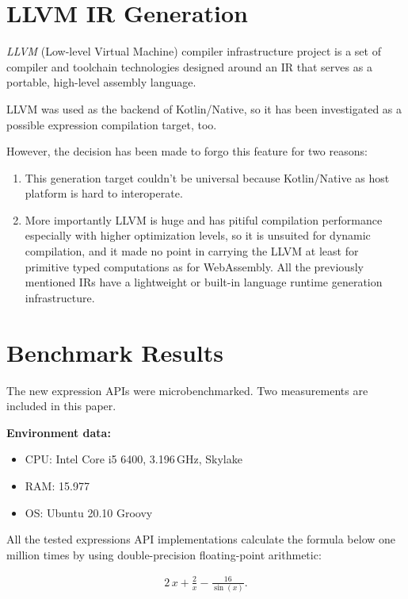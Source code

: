 \documentclass[conference]{IEEEtran}
\begin{document}
\section{LLVM IR Generation}
\textit{LLVM} (Low-level Virtual Machine) \cite{1281665} compiler infrastructure project is a set of compiler and toolchain technologies designed around an IR that serves as a portable, high-level assembly language.

LLVM was used as the backend of Kotlin/Native, so it has been investigated as a possible expression compilation target, too.

However, the decision has been made to forgo this feature for two reasons:

\begin{enumerate}
    \item This generation target couldn't be universal because Kotlin/Native as host platform is hard to interoperate.
    \item More importantly LLVM is huge and has pitiful compilation performance especially with higher optimization levels, so it is unsuited for dynamic compilation, and it made no point in carrying the LLVM at least for primitive typed computations as for WebAssembly. All the previously mentioned IRs have a lightweight or built-in language runtime generation infrastructure.
\end{enumerate}

\section{Benchmark Results}

The new expression APIs were microbenchmarked. Two measurements are included in this paper.

\textbf{Environment data:}

\begin{itemize}
    \item CPU: Intel Core i5 6400, 3.196\,\si{\GHz}, Skylake
    \item RAM: 15.977\,\si{\gibi\byte}
    \item OS: Ubuntu 20.10 Groovy
\end{itemize}

All the tested expressions API implementations calculate the formula below one million times by using double-precision floating-point arithmetic:

\begin{align}
    2\,x + \frac{2}{x} - \frac{16}{\sin{(x)}}.
\end{align}
\end{document}
